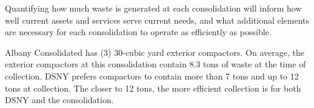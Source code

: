
    Quantifying how much waste is generated at each consolidation will inform how well current assets and services serve current needs, and what additional elements are necessary for each consolidation to operate as efficiently as possible.
    
    Albany Consolidated has (3) 30-cubic yard exterior compactors. On average, the exterior compactors at this consolidation contain 8.3 tons of waste at the time of collection. DSNY prefers compactors to contain more than 7 tons and up to 12 tons at collection. The closer to 12 tons, the more efficient collection is for both DSNY and the consolidation.